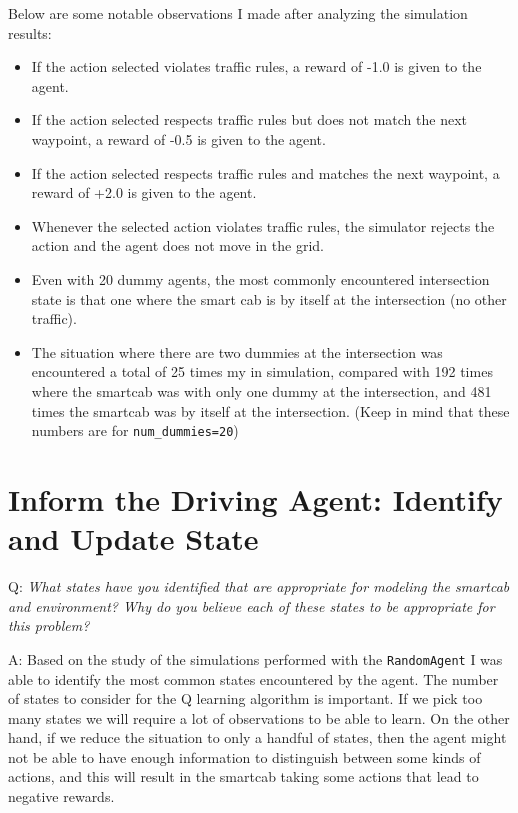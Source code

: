 \documentclass[conference]{IEEEtran}
\begin{document}
Below are some notable observations I made after analyzing the simulation
results:

\begin{itemize}
\item If the action selected violates traffic rules, a reward of -1.0 is given
    to the agent. 

\item If the action selected respects traffic rules but does not match the next
    waypoint, a reward of -0.5 is given to the agent. 

\item If the action selected respects traffic rules and matches the next
    waypoint, a reward of +2.0 is given to the agent. 
  
\item Whenever the selected action violates traffic rules, the simulator
    rejects the action and the agent does not move in the grid. 
  
\item Even with 20 dummy agents, the most commonly encountered
    intersection state is that one where the smart cab is by itself at the
        intersection (no other traffic).  
  
\item The situation where there are two dummies at the intersection was
    encountered a total of 25 times my in simulation, compared with 192 times
        where the smartcab was with only one dummy at the intersection, and 481
        times the smartcab was by itself at the intersection. (Keep in mind
        that these numbers are for \verb"num_dummies=20")

\end{itemize} 


\section{Inform the Driving Agent: Identify and Update State}

\vspace{1em}
\noindent Q: \textit{What states have you identified that are appropriate for
modeling the smartcab and environment? Why do you believe each of these states
to be appropriate for this problem?}


\vspace{2em} \noindent A: Based on the study of the simulations performed with
the \verb"RandomAgent" I was able to identify the most common states
encountered by the agent.  The number of states to consider for the Q learning
algorithm is important.  If we pick too many states we will require a lot of
observations to be able to learn.  On the other hand, if we reduce the
situation to only a handful of states, then the agent might not be able to have
enough information to distinguish between some kinds of actions, and this will
result in the smartcab taking some actions that lead to negative rewards.
\end{document}
